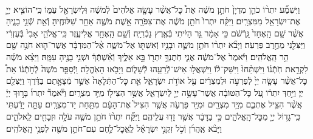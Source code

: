 \documentclass[twoside, openany, parskip=half, 11pt]{book}
\begin{document}
\begin{footnotesize}
\begin{multicols}{2}
\\
וַיִּשְׁמַ֞ע יִתְר֨וֹ כֹהֵ֤ן מִדְיָן֙ חֹתֵ֣ן מֹשֶׁ֔ה אֵת֩ כׇּל־אֲשֶׁ֨ר עָשָׂ֤ה אֱלֹהִים֙ לְֿמֹשֶׁ֔ה וּֽלְיִשְׂרָאֵ֖ל עַמּ֑וֹ כִּֽי־הוֹצִ֧יא יְיָ֛ אֶת־יִשְׂרָאֵ֖ל מִמִּצְרָֽיִם׃ וַיִּקַּ֗ח יִתְרוֹ֙ חֹתֵ֣ן מֹשֶׁ֔ה אֶת־צִפֹּרָ֖ה אֵ֣שֶׁת מֹשֶׁ֑ה אַחַ֖ר שִׁלּוּחֶֽיהָ׃ וְֿאֵ֖ת שְֿׁנֵ֣י בָנֶ֑יהָ אֲשֶׁ֨ר שֵׁ֤ם הָֽאֶחָד֙ גֵּֽרְֿשֹׁ֔ם כִּ֣י אָמַ֔ר גֵּ֣ר הָיִ֔יתִי בְּֿאֶ֖רֶץ נָכְֿרִיָּֽה׃ וְֿשֵׁ֥ם הָֽאֶחָ֖ד אֱלִיעֶ֑זֶר כִּֽי־אֱלֹהֵ֤י אָבִי֙ בְּֿעֶזְרִ֔י וַיַּצִּלֵ֖נִי מֵחֶ֥רֶב פַּרְעֹֽה׃  וַיָּבֹ֞א יִתְר֨וֹ חֹתֵ֥ן מֹשֶׁ֛ה וּבָנָ֥יו וְֿאִשְׁתּ֖וֹ אֶל־מֹשֶׁ֑ה אֶ֨ל־הַמִּדְבָּ֔ר אֲשֶׁר־ה֛וּא חֹנֶ֥ה שָׁ֖ם הַ֥ר הָֽאֱלֹהִֽים׃ וַיֹּ֨אמֶר֙ אֶל־מֹשֶׁ֔ה אֲנִ֛י חֹֽתֶנְךָ֥ יִתְר֖וֹ בָּ֣א אֵלֶ֑יךָ וְֿאִ֨שְׁתְּֿךָ֔ וּשְׁנֵ֥י בָנֶ֖יהָ עִמָּֽהּ׃ וַיֵּצֵ֨א מֹשֶׁ֜ה לִקְרַ֣את חֹֽתְֿנ֗וֹ וַיִּשְׁתַּ֨חוּ֙ וַיִּשַּׁק־ל֔וֹ וַיִּשְׁאֲל֥וּ אִישׁ־לְֿרֵעֵ֖הוּ לְֿשָׁל֑וֹם וַיָּבֹ֖אוּ הָאֹֽהֱלָה׃ וַיְֿסַפֵּ֤ר מֹשֶׁה֙ לְֿחֹ֣תְֿנ֔וֹ אֵת֩ כׇּל־אֲשֶׁ֨ר עָשָׂ֤ה יְיָ֙ לְֿפַרְעֹ֣ה וּלְמִצְרַ֔יִם עַ֖ל אוֹדֹ֣ת יִשְׂרָאֵ֑ל אֵ֤ת כׇּל־הַתְּֿלָאָה֙ אֲשֶׁ֣ר מְֿצָאָ֣תַם בַּדֶּ֔רֶךְ וַיַּצִּלֵ֖ם יְיָ׃  וַיִּ֣חַדְּ יִתְר֔וֹ עַ֚ל כׇּל־הַטּוֹבָ֔ה אֲשֶׁר־עָשָׂ֥ה יְיָ֖ לְֿיִשְׂרָאֵ֑ל אֲשֶׁ֥ר הִצִּיל֖וֹ מִיַּ֥ד מִצְרָֽיִם׃ וַיֹּ֘אמֶר֘ יִתְרוֹ֒ בָּר֣וּךְ יְיָ֔ אֲשֶׁ֨ר הִצִּ֥יל אֶתְכֶ֛ם מִיַּ֥ד מִצְרַ֖יִם וּמִיַּ֣ד פַּרְעֹ֑ה אֲשֶׁ֤ר הִצִּיל֙ אֶת־הָעָ֔ם מִתַּ֖חַת יַד־מִצְרָֽיִם׃ עַתָּ֣ה יָדַ֔עְתִּי כִּֽי־גָד֥וֹל יְיָ֖ מִכׇּל־הָֽאֱלֹהִ֑ים כִּ֣י בַדָּבָ֔ר אֲשֶׁ֥ר זָד֖וּ עֲלֵיהֶֽם׃ וַיִּקַּ֞ח יִתְר֨וֹ חֹתֵ֥ן מֹשֶׁ֛ה עֹלָ֥ה וּזְבָחִ֖ים לֵֽאלֹהִ֑ים וַיָּבֹ֨א אַֽהֲרֹ֜ן וְֿכֹ֣ל זִקְנֵ֣י יִשְׂרָאֵ֗ל לֶֽאֱכׇל־לֶ֛חֶם עִם־חֹתֵ֥ן מֹשֶׁ֖ה לִפְנֵ֥י הָֽאֱלֹהִֽים׃


\end{multicols}
\end{footnotesize}
\end{document}
